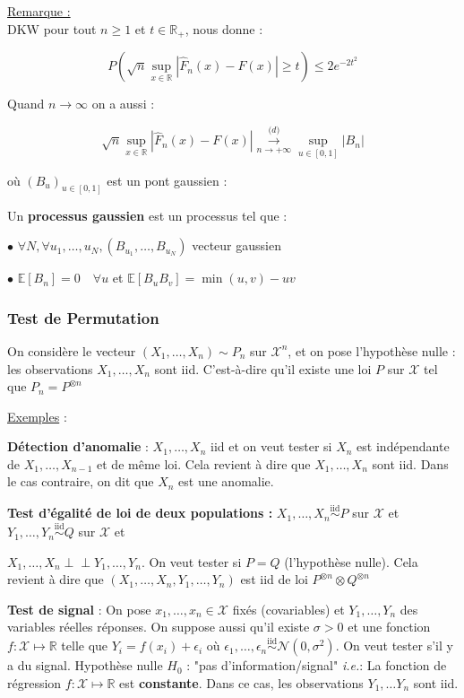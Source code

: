 \documentclass[12pt]{article}
\newcommand{\espace}{\vspace{1.5em}}
\newcommand{\petitespace}{\vspace{0.5cm}}
\newcommand{\shift}{\hspace{2em}}
\newcommand{\bb}[1]{\mathbb{#1}} %
\newcommand{\R}{\bb{R}} %
\newcommand{\ie}{\textit{i.e.}}
\newcommand{\Rq}{\underline{Remarque :} \\}
\renewcommand{\cal}{\mathcal}
\newcommand{\Sup}[1]{\sup\limits_{#1}}%
\newcommand{\normale}[2]{\mathcal{N}(#1,#2)} %
\newcommand{\Xunan}{X_1,\ldots,X_n} %
\newcommand{\esp}[1]{\bb{ E} \mathopen{}\left[#1\right]} %
\newcommand{\indep}{\perp \!\!\! \perp} %
\newcommand{\simiid}{\overset{\text{iid}}{\sim}}
\newcommand{\1}{\bb{1}} %
\newcommand{\cvn}{\underset{n\rightarrow+\infty}{\longrightarrow}} %
\newcommand{\cvl}{\overset{\mathcal (d)}{\cvn}} %
\begin{document}
\Rq 

DKW pour tout $n \ge 1$ et $t \in \R_+$, nous donne :

$$P(\sqrt n \Sup{x \in \R}|\widehat F_n(x)-F(x)| \ge t)\le 2e^{-2t^2}$$
	
Quand $n \to \infty$ on a aussi :

$$\sqrt n \Sup{x \in \R}|\widehat F_n(x)-F(x)| \cvl \Sup{u \in [0,1]}|B_n| $$

où $(B_u)_{u \in [0,1] }$ est un pont gaussien : \petitespace

Un \textbf{processus gaussien} est un processus tel que : \petitespace

\shift$\bullet$ $\forall N, \forall u_1 , \ldots, u_N, (B_{u_1}, \ldots, B_{u_N})$ vecteur gaussien

\petitespace
	
\shift$\bullet$  $\esp{B_n} = 0\quad  \forall u$ et $\esp{B_uB_v} = \min(u,v)-uv$\espace

\subsubsection{Test de Permutation}
\espace



On considère le vecteur $(\Xunan)\sim P_n$ sur $\cal X^n$, et on pose l'hypothèse nulle : les observations $\Xunan$ sont iid. C'est-à-dire qu'il existe une loi $P$ sur $\cal X$ tel que $P_n = P^{\otimes n}$

\petitespace

\underline{Exemples} :\petitespace

\textbf{Détection d'anomalie} : $\Xunan$ iid et on veut tester si $X_n$ est indépendante de $X_1, \ldots, X_{n-1}$ et de même loi. Cela revient à dire que $\Xunan$ sont iid. Dans le cas contraire, on dit que $X_n$ est une anomalie.

\petitespace

\petitespace
	
\textbf{Test d'égalité de loi de deux populations :} $\Xunan\simiid P$ sur $\cal X$ et $Y_1, \ldots, Y_n \simiid Q$ sur $\cal X$ et


$\Xunan \indep  Y_1, \ldots, Y_n$. On veut tester si $P=Q$ (l'hypothèse nulle). Cela revient à dire que  $(\Xunan, Y_1, \ldots, Y_n)$ est iid de loi $P^{\otimes n}\otimes Q^{\otimes n}$

\petitespace

 \petitespace

\textbf{Test de signal} : On pose $x_1, \ldots, x_n \in \cal X$ fixés (covariables) et $Y_1, \ldots, Y_n$ des variables réelles réponses. On suppose aussi qu'il existe $\sigma>0$ et une fonction $f : \cal X \mapsto \R$ telle que $Y_i =f(x_i)+\epsilon_i$ où $\epsilon_1, \ldots, \epsilon_n \simiid \normale{0}{\sigma^2}$. On veut tester s'il y a du signal. Hypothèse nulle $H_0$ : "pas d'information/signal" \ie: La fonction de régression $f: \cal X \mapsto \R$ est \textbf{constante}. Dans ce cas, les observations $Y_1, \ldots Y_n$ sont iid. \petitespace
\end{document}

